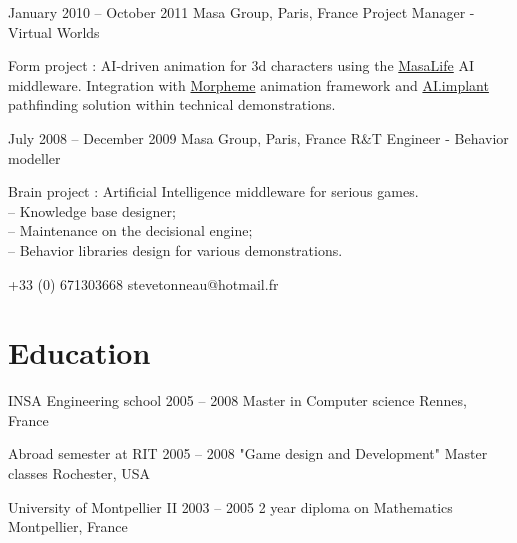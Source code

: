 \documentclass{tccv}
\begin{document}
\begin{eventlist}

\item{January 2010 -- October 2011}
     {Masa Group, Paris, France}
     {Project Manager - Virtual Worlds}

Form project : AI-driven animation for 3d characters using the \href{http://www.masagroup.net/products/masa-life/}{MasaLife} AI middleware.
Integration with \href{http://www.naturalmotion.com/products/morpheme/}{Morpheme} animation framework and
\href{http://www.presagis.com/products_services/products/modeling-simulation/simulation/aiimplant/}{AI.implant} pathfinding
solution within technical demonstrations.

\item{July 2008 -- December 2009}
     {Masa Group, Paris, France}
     {R\&T Engineer - Behavior modeller}

Brain project : Artificial Intelligence middleware for serious games.
\\ -- Knowledge base designer;
\\ -- Maintenance on the decisional engine;
\\ -- Behavior libraries design for various demonstrations.

\end{eventlist}


    {+33 (0) 671303668}
    {stevetonneau@hotmail.fr}

\section{Education}

\begin{yearlist}

 \item[INSA Engineering school ]{2005 -- 2008}
     {Master in Computer science}
     {Rennes, France}
 
\item[Abroad semester at RIT]{2005 -- 2008 }
     {"Game design and Development" Master classes}
     {Rochester, USA}

\item[University of Montpellier II]{2003 -- 2005}
	 {2 year diploma on Mathematics}
     {Montpellier, France}
	 


\end{yearlist}
\end{document}

